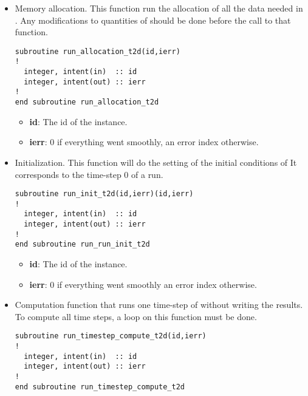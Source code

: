 \begin{itemize}
\begin{WarningBlock}{Warning:}
\centering
With the API we are not using the temporary folder (this folder was created by
the \python environment and all the file declared in the steering file
where copied and renamed inside that folder) which means that the name and path
given in the steering file will be used.
\end{WarningBlock}

\item Memory allocation. This function run the allocation of all the data
  needed in . Any modifications to quantities of 
  should be done before the call to that function.

\begin{lstlisting}
subroutine run_allocation_t2d(id,ierr)
!
  integer, intent(in)  :: id
  integer, intent(out) :: ierr
!
end subroutine run_allocation_t2d
\end{lstlisting}

\begin{itemize}
\item \textbf{id}: The id of the instance.
\item \textbf{ierr}: 0 if everything went smoothly, an error index otherwise.
\end{itemize}

\item Initialization. This function will do the setting of the initial
  conditions of  It corresponds to the time-step 0 of a
   run.

\begin{lstlisting}
subroutine run_init_t2d(id,ierr)(id,ierr)
!
  integer, intent(in)  :: id
  integer, intent(out) :: ierr
!
end subroutine run_run_init_t2d
\end{lstlisting}

\begin{itemize}
\item \textbf{id}: The id of the instance.
\item \textbf{ierr}: 0 if everything went smoothly an error index otherwise.
\end{itemize}


\item Computation function that runs one time-step of  without
  writing the results. To compute all time steps, a loop on this function must
  be done.

\begin{lstlisting}
subroutine run_timestep_compute_t2d(id,ierr)
!
  integer, intent(in)  :: id
  integer, intent(out) :: ierr
!
end subroutine run_timestep_compute_t2d
\end{lstlisting}



\end{itemize}
